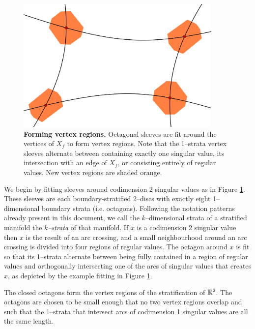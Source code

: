 \begin{figure}[h!]
	\centering
	\includegraphics[width=0.9\textwidth]{figures/vertex-sleeve.png}
	\caption{
		\textbf{Forming vertex regions.}
		Octagonal sleeves are fit around the vertices of $X_f$ to form vertex regions.
		Note that the 1--strata vertex sleeves alternate between containing exactly one singular value, its intersection with an edge of $X_f$, or consisting entirely of regular values.
		New vertex regions are shaded orange.
	}
	\label{fig:vertex-sleeve}
\end{figure}

We begin by fitting sleeves around codimension 2 singular values as in Figure \ref{fig:vertex-sleeve}.
These sleeves are each boundary-stratified 2--discs with exactly eight 1--dimensional boundary strata (i.e. octagons).
Following the notation patterns already present in this document, we call the $k$--dimensional strata of a stratified manifold the \emph{$k$--strata} of that manifold.
If $x$ is a codimension 2 singular value then $x$ is the result of an arc crossing, and a small neighbourhood around an arc crossing is divided into four regions of regular values.
The octagon around $x$ is fit so that its 1--strata alternate between being fully contained in a region of regular values and orthogonally intersecting one of the arcs of singular values that creates $x$, as depicted by the example fitting in Figure \ref{fig:vertex-sleeve}.

The closed octagons form the vertex regions of the stratification of $\mathbb{R}^2$.
The octagons are chosen to be small enough that no two vertex regions overlap and such that the 1--strata that intersect arcs of codimension 1 singular values are all the same length.

